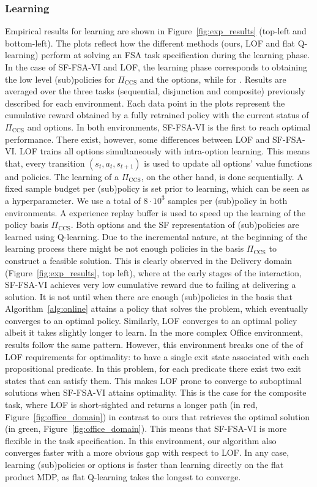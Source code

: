 \subsubsection{Learning} Empirical results for learning are shown in Figure~\ref{fig:exp_results} (top-left and bottom-left). The plots reflect how the different methods (ours, LOF and flat Q-learning) perform at solving an FSA task specification during the learning phase. In the case of SF-FSA-VI and LOF, the learning phase corresponds to obtaining the low level (sub)policies for $\Pi_\text{CCS}$ and the options, while for . Results are averaged over the three tasks (sequential, disjunction and composite) previously described for each environment. Each data point in the plots represent the cumulative reward obtained by a fully retrained policy with the current status of $\Pi_\text{CCS}$ and options. In both environments, SF-FSA-VI is the first to reach optimal performance. There exist, however, some differences between LOF and SF-FSA-VI. LOF trains all options simultaneously with intra-option learning. This means that, every transition $(s_t, a_t, s_{t+1})$ is used to update all options' value functions and policies. The learning of a $\Pi_\text{CCS}$, on the other hand, is done sequentially. A fixed sample budget per (sub)policy is set prior to learning, which can be seen as a hyperparameter. We use a total of $8\cdot 10^3$ samples per (sub)policy in both environments. A experience replay buffer is used to speed up the learning of the policy basis $\Pi_\text{CCS}$. Both options and the SF representation of (sub)policies are learned using Q-learning. Due to the incremental nature, at the beginning of the learning process there might be not enough policies in the basis $\Pi_\text{CCS}$ to construct a feasible solution. This is clearly observed in the Delivery domain (Figure~\ref{fig:exp_results}, top left), where at the early stages of the interaction, SF-FSA-VI achieves very low cumulative reward due to failing at delivering a solution. It is not until when there are enough (sub)policies in the basis that Algorithm~\ref{alg:online} attains a policy that solves the problem, which eventually converges to an optimal policy. Similarly, LOF converges to an optimal policy albeit it takes slightly longer to learn. In the more complex Office environment, results follow the same pattern. However, this environment breaks one of the of LOF requirements for optimality: to have a single exit state associated with each propositional predicate. In this problem, for each predicate there exist two exit states that can satisfy them. This makes LOF prone to converge to suboptimal solutions when SF-FSA-VI attains optimality. This is the case for the composite task, where LOF is short-sighted and returns a longer path (in red, Figure~\ref{fig:office_domain}) in contrast to ours that retrieves the optimal solution (in green, Figure~\ref{fig:office_domain}). This means that SF-FSA-VI is more flexible in the task specification. In this environment, our algorithm also converges faster with a more obvious gap with respect to LOF. In any case, learning (sub)policies or options is faster than learning directly on the flat product MDP, as flat Q-learning takes the longest to converge.
